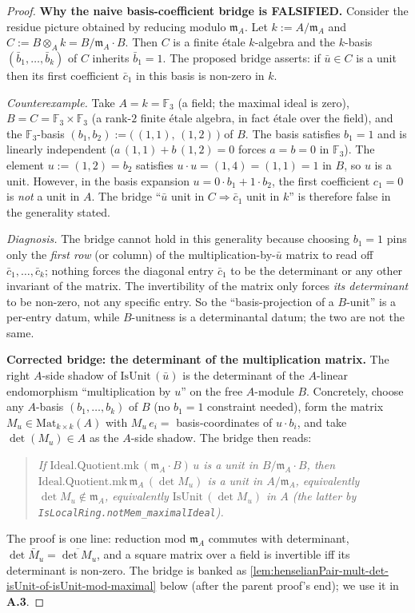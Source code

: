 \begin{proof}
\textbf{Why the naive basis-coefficient bridge is FALSIFIED.}
Consider the residue picture obtained by reducing modulo
$\mathfrak m_A$. Let $k := A / \mathfrak m_A$ and
$C := B \otimes_A k = B / \mathfrak m_A \cdot B$. Then $C$ is a
finite étale $k$-algebra and the $k$-basis $(\bar b_1, \ldots,
\bar b_k)$ of $C$ inherits $\bar b_1 = 1$. The proposed bridge
asserts: if $\bar u \in C$ is a unit then its first coefficient
$\bar c_1$ in this basis is non-zero in $k$.

\emph{Counterexample.} Take $A = k = \mathbb{F}_3$ (a field; the
maximal ideal is zero), $B = C = \mathbb{F}_3 \times \mathbb{F}_3$
(a rank-$2$ finite étale algebra, in fact étale over the field),
and the $\mathbb{F}_3$-basis
$(b_1, b_2) := \bigl(\,(1,1),\,(1,2)\,\bigr)$ of $B$. The basis
satisfies $b_1 = 1$ and is linearly independent
($a\,(1,1) + b\,(1,2) = 0$ forces $a = b = 0$ in $\mathbb{F}_3$).
The element $u := (1, 2) = b_2$ satisfies
$u \cdot u = (1, 4) = (1, 1) = 1$ in $B$, so $u$ is a unit.
However, in the basis expansion $u = 0 \cdot b_1 + 1 \cdot b_2$,
the first coefficient $c_1 = 0$ is \emph{not} a unit in $A$.
The bridge ``$\bar u$ unit in $C \Rightarrow \bar c_1$ unit in
$k$'' is therefore false in the generality stated.

\emph{Diagnosis.} The bridge cannot hold in this generality
because choosing $b_1 = 1$ pins only the \emph{first row} (or
column) of the multiplication-by-$\bar u$ matrix to read off
$\bar c_1, \ldots, \bar c_k$; nothing forces the diagonal entry
$\bar c_1$ to be the determinant or any other invariant of the
matrix. The invertibility of the matrix only forces \emph{its
determinant} to be non-zero, not any specific entry. So the
``basis-projection of a $B$-unit'' is a per-entry datum, while
$B$-unitness is a determinantal datum; the two are not the same.

\textbf{Corrected bridge: the determinant of the
multiplication matrix.} The right $A$-side shadow of
$\mathrm{IsUnit}\,(\bar u)$ is the determinant of the
$A$-linear endomorphism ``multiplication by $u$'' on the free
$A$-module $B$. Concretely, choose any $A$-basis
$(b_1, \ldots, b_k)$ of $B$ (no $b_1 = 1$ constraint needed),
form the matrix $M_u \in \mathrm{Mat}_{k\times k}(A)$ with
$M_u\,e_i = $ basis-coordinates of $u \cdot b_i$, and take
$\det(M_u) \in A$ as the $A$-side shadow. The bridge then reads:
\begin{quote}
\emph{If $\mathrm{Ideal.Quotient.mk}\,(\mathfrak m_A \cdot B)\,
u$ is a unit in $B / \mathfrak m_A \cdot B$, then
$\mathrm{Ideal.Quotient.mk}\,\mathfrak m_A\,(\det M_u)$ is a unit
in $A / \mathfrak m_A$, equivalently
$\det M_u \notin \mathfrak m_A$, equivalently
$\mathrm{IsUnit}\,(\det M_u)$ in $A$ (the latter by
\texttt{IsLocalRing.notMem\_maximalIdeal}).}
\end{quote}
The proof is one line: reduction mod $\mathfrak m_A$ commutes with
determinant, $\det \bar M_u = \overline{\det M_u}$, and a square
matrix over a field is invertible iff its determinant is
non-zero. The bridge is banked as
\cref{lem:henselianPair-mult-det-isUnit-of-isUnit-mod-maximal}
below (after the parent proof's end); we use it in \textbf{A.3}.


\end{proof}
